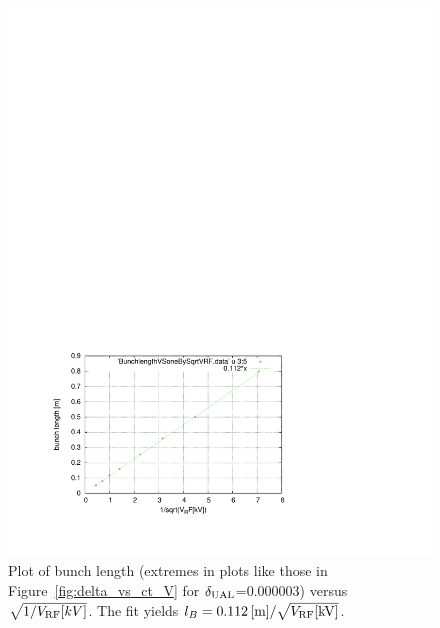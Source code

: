 \documentclass[]{article}
\begin{document}
\begin{figure}[h]
\centering
\includegraphics[scale=0.7]{pdf/BunchlengthVSoneBySqrtVRF.pdf}
\caption{\label{fig:BunchlengthVSoneBySqrtVRF}Plot of bunch length
(extremes in plots like those in Figure~\ref{fig:delta_vs_ct_V} for 
$\delta_{\rm UAL}$=0.000003) 
versus $\sqrt{1/V_{\rm RF}[kV]}$.
The fit yields $l_B=0.112\,[{\rm m}]/\sqrt{V_{\rm RF}[{\rm kV}]}$.
}
\end{figure}
%

\clearpage
\end{document}
